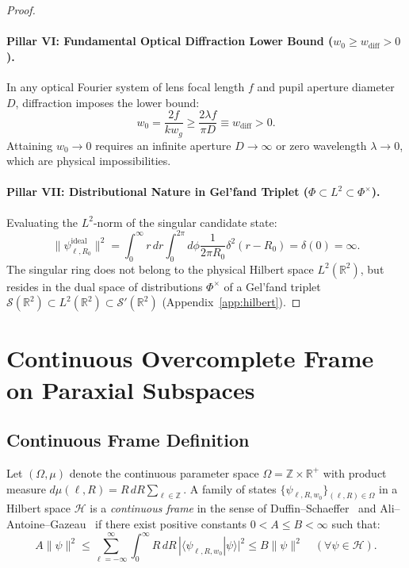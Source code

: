 \documentclass[11pt,a4paper]{article}
\begin{document}
\begin{proof}
\paragraph{Pillar VI: Fundamental Optical Diffraction Lower Bound ($w_0 \ge w_{\text{diff}} > 0$).}
In any optical Fourier system of lens focal length $f$ and pupil aperture diameter $D$, diffraction imposes the lower bound:
\begin{equation}
\boxed{w_0 = \frac{2 f}{k w_g} \ge \frac{2 \lambda f}{\pi D} \equiv w_{\text{diff}} > 0.}
\label{eq:pillar6_result}
\end{equation}
Attaining $w_0 \to 0$ requires an infinite aperture $D \to \infty$ or zero wavelength $\lambda \to 0$, which are physical impossibilities.

\paragraph{Pillar VII: Distributional Nature in Gel'fand Triplet ($\Phi \subset L^2 \subset \Phi^\times$).}
Evaluating the $L^2$-norm of the singular candidate state:
\begin{equation}
\boxed{\|\psi_{\ell, R_0}^{\text{ideal}}\|^2 = \int_0^\infty r \, dr \int_0^{2\pi} d\phi \frac{1}{2\pi R_0} \delta^2(r - R_0) = \delta(0) = \infty.}
\label{eq:pillar7_result}
\end{equation}
The singular ring does not belong to the physical Hilbert space $L^2(\mathbb{R}^2)$, but resides in the dual space of distributions $\Phi^\times$ of a Gel'fand triplet $\mathcal{S}(\mathbb{R}^2) \subset L^2(\mathbb{R}^2) \subset \mathcal{S}'(\mathbb{R}^2)$ (Appendix~\ref{app:hilbert}).
\end{proof}


\section{Continuous Overcomplete Frame on Paraxial Subspaces}
\label{sec:frame_theory}

\subsection{Continuous Frame Definition}

Let $(\Omega, \mu)$ denote the continuous parameter space $\Omega = \mathbb{Z} \times \mathbb{R}^+$ with product measure $d\mu(\ell, R) = R \, dR \sum_{\ell \in \mathbb{Z}}$. A family of states $\{\psi_{\ell, R, w_0}\}_{(\ell, R) \in \Omega}$ in a Hilbert space $\mathcal{H}$ is a \emph{continuous frame} in the sense of Duffin--Schaeffer~\cite{Duffin1952} and Ali--Antoine--Gazeau~\cite{Ali1993,Daubechies1990,Christensen2016} if there exist positive constants $0 < A \le B < \infty$ such that:
\begin{equation}
A \|\psi\|^2 \le \sum_{\ell=-\infty}^\infty \int_0^\infty R \, dR \, |\langle \psi_{\ell, R, w_0} | \psi \rangle|^2 \le B \|\psi\|^2 \quad (\forall \psi \in \mathcal{H}).
\label{eq:frame_def}
\end{equation}
\end{document}
